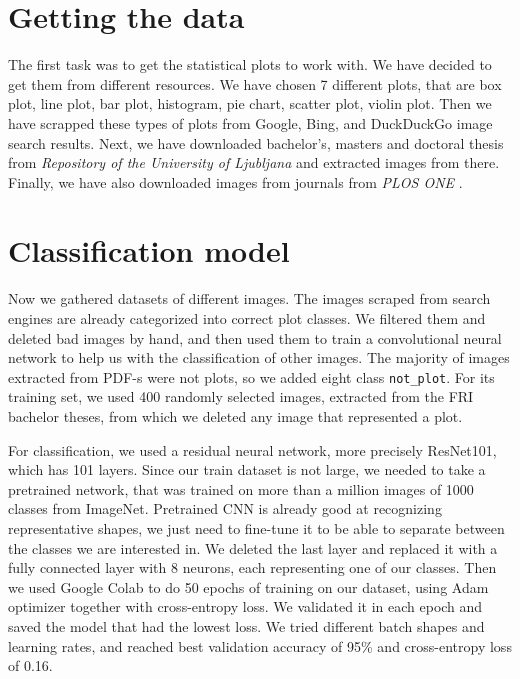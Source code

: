 \documentclass[fleqn,moreauthors,10pt]{ds_report}
\begin{document}
	
	\section*{Getting the data}
	The first task was to get the statistical plots to work with. We have decided to get them from different resources. We have chosen 7 different plots, that are box plot, line plot, bar plot, histogram, pie chart, scatter plot, violin plot. Then we have scrapped these types of plots from Google, Bing, and DuckDuckGo image search results. Next, we have downloaded bachelor's, masters and doctoral thesis from \emph{Repository of the University of Ljubljana} \cite{repositoryUL} and extracted images from there. Finally, we have also downloaded images from journals from \emph{PLOS ONE} \cite{plosone}.
	
	\section*{Classification model}
	Now we gathered datasets of different images. The images scraped from search engines are already categorized into correct plot classes. We filtered them and deleted bad images by hand, and then used them to train a convolutional neural network to help us with the classification of other images. The majority of images extracted from PDF-s were not plots, so we added eight class \texttt{not\_plot}. For its training set, we used 400 randomly selected images, extracted from the FRI bachelor theses, from which we deleted any image that represented a plot. 
	
	For classification, we used a residual neural network, more precisely ResNet101, which has 101 layers. Since our train dataset is not large, we needed to take a pretrained network, that was trained on more than a million images of 1000 classes from ImageNet. Pretrained CNN is already good at recognizing representative shapes, we just need to fine-tune it to be able to separate between the classes we are interested in. We deleted the last layer and replaced it with a fully connected layer with 8 neurons, each representing one of our classes. Then we used Google Colab to do 50 epochs of training on our dataset, using Adam optimizer together with cross-entropy loss. We validated it in each epoch and saved the model that had the lowest loss. We tried different batch shapes and learning rates, and reached best validation accuracy of 95\% and cross-entropy loss of 0.16. 
	
\end{document}
